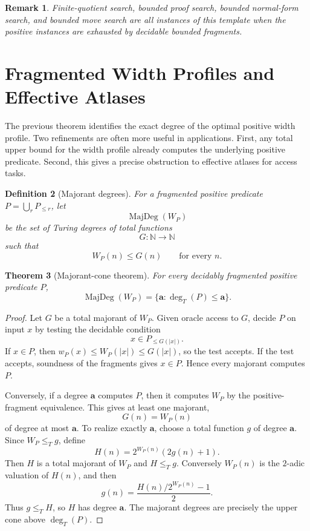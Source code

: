 \documentclass[11pt]{article}
\newtheorem{theorem}{Theorem}[section]
\newtheorem{definition}[theorem]{Definition}
\newtheorem{remark}[theorem]{Remark}
\begin{document}
\begin{remark}
Finite-quotient search, bounded proof search, bounded normal-form search, and bounded move search are all instances of this template when the positive instances are exhausted by decidable bounded fragments.
\end{remark}

\section{Fragmented Width Profiles and Effective Atlases}

The previous theorem identifies the exact degree of the optimal positive width profile. Two refinements are often more useful in applications. First, any total upper bound for the width profile already computes the underlying positive predicate. Second, this gives a precise obstruction to effective atlases for access tasks.

\begin{definition}[Majorant degrees]
For a fragmented positive predicate \(P=\bigcup_r P_{\le r}\), let
\[
\operatorname{MajDeg}(W_P)
\]
be the set of Turing degrees of total functions
\[
G:\mathbb N\to\mathbb N
\]
such that
\[
W_P(n)\le G(n)
\qquad
\text{for every }n.
\]
\end{definition}

\begin{theorem}[Majorant-cone theorem]
For every decidably fragmented positive predicate \(P\),
\[
\operatorname{MajDeg}(W_P)
=
\{\mathbf a:\deg_T(P)\le \mathbf a\}.
\]
\end{theorem}

\begin{proof}
Let \(G\) be a total majorant of \(W_P\). Given oracle access to \(G\), decide \(P\) on input \(x\) by testing the decidable condition
\[
x\in P_{\le G(|x|)}.
\]
If \(x\in P\), then \(w_P(x)\le W_P(|x|)\le G(|x|)\), so the test accepts. If the test accepts, soundness of the fragments gives \(x\in P\). Hence every majorant computes \(P\).

Conversely, if a degree \(\mathbf a\) computes \(P\), then it computes \(W_P\) by the positive-fragment equivalence. This gives at least one majorant,
\[
G(n)=W_P(n)
\]
of degree at most \(\mathbf a\). To realize exactly \(\mathbf a\), choose a total function \(g\) of degree \(\mathbf a\). Since \(W_P\le_T g\), define
\[
H(n)=2^{W_P(n)}(2g(n)+1).
\]
Then \(H\) is a total majorant of \(W_P\) and \(H\le_T g\). Conversely \(W_P(n)\) is the \(2\)-adic valuation of \(H(n)\), and then
\[
g(n)=\frac{H(n)/2^{W_P(n)}-1}{2}.
\]
Thus \(g\le_T H\), so \(H\) has degree \(\mathbf a\). The majorant degrees are precisely the upper cone above \(\deg_T(P)\).
\end{proof}
\end{document}
